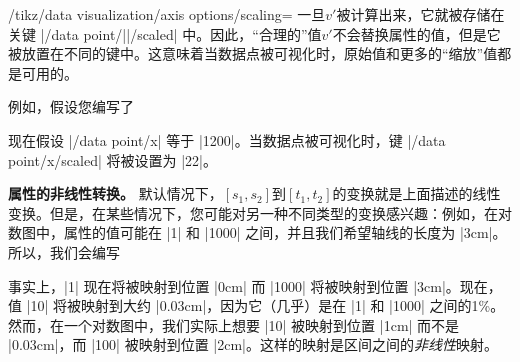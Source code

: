 \begin{key}{/tikz/data visualization/axis options/scaling=}
    一旦$v'$被计算出来，它就被存储在关键 |/data point/||/scaled| 中。因此，``合理的''值$v'$不会替换属性的值，但是它被放置在不同的键中。这意味着当数据点被可视化时，原始值和更多的``缩放''值都是可用的。


    例如，假设您编写了
\begin{codeexample}
\end{codeexample}
    现在假设 |/data point/x| 等于 |1200|。当数据点被可视化时，键 |/data point/x/scaled| 将被设置为 |22|。

    \medskip

    \textbf{属性的非线性转换。} 默认情况下，$[s_1,s_2]$到$[t_1,t_2]$的变换就是上面描述的线性变换。但是，在某些情况下，您可能对另一种不同类型的变换感兴趣：例如，在对数图中，属性的值可能在 |1| 和 |1000| 之间，并且我们希望轴线的长度为 |3cm|。所以，我们会编写
\begin{codeexample}
\end{codeexample}
    事实上，|1| 现在将被映射到位置 |0cm| 而 |1000| 将被映射到位置 |3cm|。现在，值 |10| 将被映射到大约 |0.03cm|，因为它（几乎）是在 |1| 和 |1000| 之间的1\%。然而，在一个对数图中，我们实际上想要 |10| 被映射到位置 |1cm| 而不是 |0.03cm|，而 |100| 被映射到位置 |2cm|。这样的映射是区间之间的\emph{非线性}映射。


\end{key}
